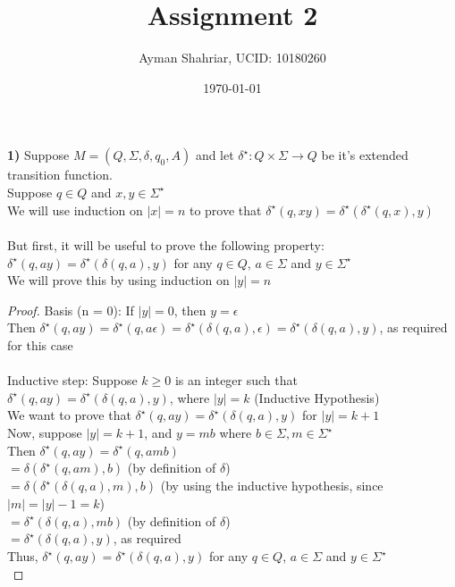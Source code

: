 \documentclass{article}
\title{Assignment 2}
\author{Ayman Shahriar, UCID: 10180260}
\date{\today}
\begin{document}
\maketitle

\textbf{1)} Suppose $M = (Q, \Sigma, \delta, q_0, A) $ and let $\delta^\star: Q \times \Sigma \rightarrow Q$ be it's extended transition function.\\
Suppose $q \in Q$ and $x, y \in \Sigma^\star$\\
We will use induction on $|x| = n$ to prove that $\delta^\star(q, xy) = \delta^\star(\delta^\star(q, x), y)$\\ \\
But first, it will be useful to prove the following property:\\ 
$\delta^\star(q, ay) = \delta^\star(\delta(q, a), y)$ for any $q \in Q$, $a \in \Sigma$ and $y \in \Sigma^\star$ \\
We will prove this by using induction on $|y| = n$
\begin{proof}
Basis (n = 0): If $|y| = 0$, then $y = \epsilon$\\
Then $\delta^\star(q, ay) = \delta^\star(q, a \epsilon) = \delta^\star(\delta(q, a), \epsilon) = \delta^\star(\delta(q, a), y)$, as required for this case\\ \\
Inductive step: Suppose $k \ge 0$ is an integer such that $\delta^\star(q, ay) = \delta^\star(\delta(q, a), y)$, where $|y| = k$ (Inductive Hypothesis)\\
We want to prove that $\delta^\star(q, ay) = \delta^\star(\delta(q, a), y)$ for $|y| = k+1$\\
Now, suppose $|y| = k+1$, and $y = mb$ where $b \in \Sigma, m \in \Sigma^\star$\\
Then $\delta^\star(q, ay) = \delta^\star(q, amb)$\\
$= \delta(\delta^\star(q, am), b)$ (by definition of $\delta$)\\
$= \delta(\delta^\star(\delta(q, a), m), b)$ (by using the inductive hypothesis, since $|m| = |y|-1 = k$)\\
$= \delta^\star(\delta(q, a), mb)$ (by definition of $\delta$)\\
$= \delta^\star(\delta(q, a), y)$, as required\\
Thus, $\delta^\star(q, ay) = \delta^\star(\delta(q, a), y)$ for any $q \in Q$, $a \in \Sigma$ and $y \in \Sigma^\star$ \\
\end{proof}
\end{document}
